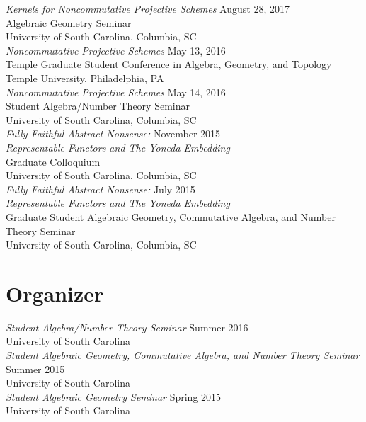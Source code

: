 \documentclass{article}
\begin{document}
\noindent\textsl{Kernels for Noncommutative Projective Schemes} \hfill August 28, 2017\\
Algebraic Geometry Seminar\\
University of South Carolina, Columbia, SC\\

\noindent\textsl{Noncommutative Projective Schemes} \hfill May 13, 2016\\
Temple Graduate Student Conference in Algebra, Geometry, and Topology\\
Temple University, Philadelphia, PA\\

\noindent\textsl{Noncommutative Projective Schemes} \hfill May 14, 2016\\
Student Algebra/Number Theory Seminar\\
University of South Carolina, Columbia, SC\\

\noindent\textsl{Fully Faithful Abstract Nonsense:} \hfill November 2015\\
\textsl{Representable Functors and The Yoneda Embedding}\\
Graduate Colloquium\\
University of South Carolina, Columbia, SC\\

\noindent\textsl{Fully Faithful Abstract Nonsense:} \hfill July 2015\\
\textsl{Representable Functors and The Yoneda Embedding}\\
Graduate Student Algebraic Geometry, Commutative Algebra, and Number Theory Seminar\\
University of South Carolina, Columbia, SC

\section*{Organizer}
\textsl{Student Algebra/Number Theory Seminar} \hfill Summer 2016\\
University of South Carolina\\

\noindent\textsl{Student Algebraic Geometry, Commutative Algebra, and Number Theory Seminar} \hfill Summer 2015\\
University of South Carolina\\

\noindent\textsl{Student Algebraic Geometry Seminar} \hfill Spring 2015\\
University of South Carolina\\
\end{document}
